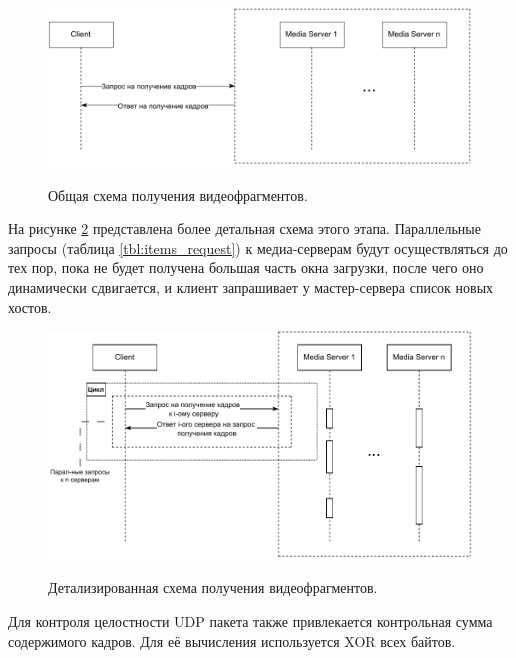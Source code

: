 \begin{figure}[h!]
	\begin{center}
		{\includegraphics[scale = 1]{img/[general][media].pdf}}
		\caption{Общая схема получения видеофрагментов.}
		\label{image:general_upload}
	\end{center}
\end{figure}

\newpage

На рисунке \ref{image:detailed_upload} представлена более детальная схема этого этапа. Параллельные запросы (таблица \ref{tbl:items_request}) к медиа-серверам будут осуществляться до тех пор, пока не будет получена большая часть окна загрузки, после чего оно динамически сдвигается, и клиент запрашивает у мастер-сервера список новых хостов. 

\begin{figure}[h!]
	\begin{center}
		{\includegraphics[scale = 1]{img/[items][media].pdf}}
		\caption{Детализированная схема получения видеофрагментов.}
		\label{image:detailed_upload}
	\end{center}
\end{figure}

Для контроля целостности UDP пакета также привлекается контрольная сумма содержимого кадров. Для её вычисления используется XOR всех байтов.

